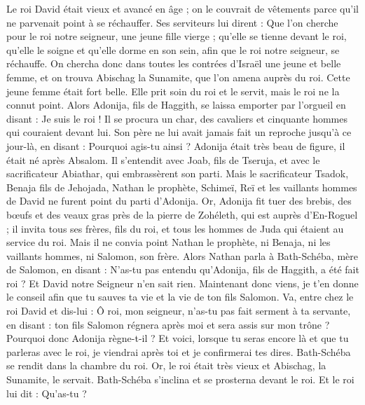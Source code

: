 \begin{multicols}{2}
\VerseOne{}Le roi David était vieux et avancé en âge ; on le couvrait de vêtements parce qu’il ne parvenait point à se réchauffer.
Ses serviteurs lui dirent : Que l'on cherche pour le roi notre seigneur, une jeune fille vierge ; qu’elle se tienne devant le roi, qu’elle le soigne et qu'elle dorme en son sein, afin que le roi notre seigneur, se réchauffe.
On chercha donc dans toutes les contrées d'Israël une jeune et belle femme, et on trouva Abischag la Sunamite, que l’on amena auprès du roi.
Cette jeune femme était fort belle. Elle prit soin du roi et le servit, mais le roi ne la connut point.
Alors Adonija, fils de Haggith, se laissa emporter par l’orgueil en disant : Je suis le roi ! Il se procura un char, des cavaliers et cinquante hommes qui couraient devant lui.
Son père ne lui avait jamais fait un reproche jusqu’à ce jour-là, en disant : Pourquoi agis-tu ainsi ? Adonija était très beau de figure, il était né après Absalom.
Il s’entendit avec Joab, fils de Tseruja, et avec le sacrificateur Abiathar, qui embrassèrent son parti.
Mais le sacrificateur Tsadok, Benaja fils de Jehojada, Nathan le prophète, Schimeï, Reï et les vaillants hommes de David ne furent point du parti d'Adonija.
Or, Adonija fit tuer des brebis, des bœufs et des veaux gras près de la pierre de Zohéleth, qui est auprès d’En-Roguel ; il invita tous ses frères, fils du roi, et tous les hommes de Juda qui étaient au service du roi.
Mais il ne convia point Nathan le prophète, ni Benaja, ni les vaillants hommes, ni Salomon, son frère.
Alors Nathan parla à Bath-Schéba, mère de Salomon, en disant : N'as-tu pas entendu qu'Adonija, fils de Haggith, a été fait roi ? Et David notre Seigneur n'en sait rien.
Maintenant donc viens, je t’en donne le conseil afin que tu sauves ta vie et la vie de ton fils Salomon.
Va, entre chez le roi David et dis-lui : Ô roi, mon seigneur, n'as-tu pas fait serment à ta servante, en disant : ton fils Salomon régnera après moi et sera assis sur mon trône ? Pourquoi donc Adonija règne-t-il ?
Et voici, lorsque tu seras encore là et que tu parleras avec le roi, je viendrai après toi et je confirmerai tes dires.
Bath-Schéba se rendit dans la chambre du roi. Or, le roi était très vieux et Abischag, la Sunamite, le servait.
Bath-Schéba s'inclina et se prosterna devant le roi. Et le roi lui dit : Qu'as-tu ?

\end{multicols}
